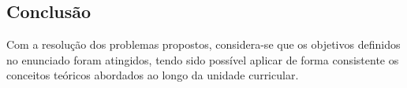 \documentclass[11pt, a4paper, fleqn]{article}
\begin{document}


\subsection*{Conclusão}

Com a resolução dos problemas propostos, considera-se que os objetivos definidos no enunciado foram atingidos, tendo sido possível aplicar de forma consistente os conceitos teóricos abordados ao longo da unidade curricular.


\printindex





\end{document}
